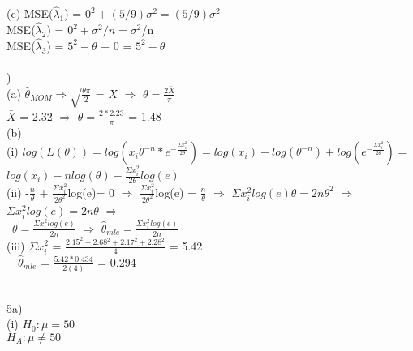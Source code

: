 \documentclass[12pt]{article}
\begin{document}
\indent (c) MSE($\hat{\lambda}_1$) = $0^2 + (5/9)\sigma^2 = (5/9)\sigma^2$\\
\indent \indent MSE($\hat{\lambda}_2$) = $0^2 + \sigma^2/n = \sigma^2$/n\\
\indent \indent MSE($\hat{\lambda}_3$) = $5^2 - \theta$ + 0 = $5^2 - \theta$\\


\noindent \hrulefill \\


)\\
\indent (a) $\hat{\theta}_{MOM}\Rightarrow ${\Large $\sqrt{\frac{\theta \pi}{2}}$} = $\bar{X}$ $\Rightarrow$ $\theta = ${\Large $\frac{2\bar{X}}{\pi}$}\\
\indent \indent $\bar{X}$ = 2.32 $\Rightarrow$ $\theta = ${\Large $\frac{2*2.23}{\pi}$} = 1.48\\

\indent (b)\\
\indent (i) $log(L(\theta)) = log(x_i\theta^{-n}*e^{-\frac{\Sigma x_i^2}{2\theta}}) = log(x_i)+log(\theta^ 	{-n})+log(e^{-\frac{\Sigma x_i^2}{2\theta}}) = $\\[.4em]
\indent \indent $log(x_i)-nlog(\theta)-${\Large$\frac{\Sigma x_i^2}{2\theta}$}$log(e)$\\[.4em]

\indent (ii) -{\Large$\frac{n}{\theta}$} + {\Large$\frac{\Sigma x_i^2}{2\theta^2}$}log(e)= 0 $\Rightarrow$ {\Large$\frac{\Sigma x_i^2}{2\theta^2}$}log(e) = {\Large$\frac{n}{\theta}$} $\Rightarrow$ $\Sigma x_i^2log(e)\theta = 2n\theta^2$ $\Rightarrow$ $\Sigma x_i^2log(e) = 2n\theta$ $\Rightarrow$ \\[.4em]
\indent \indent \ $ \theta = ${\Large$\frac{\Sigma x_i^2log(e)}{2n}$} $\Rightarrow$ $\hat{\theta}_{mle} = ${\Large$\frac{\Sigma x_i^2log(e)}{2n}$}\\

\indent (iii) $\Sigma x_i^2$ = {\Large$\frac{2.15^2 + 2.68^2 + 2.17^2 + 2.28^2}{4}$} = 5.42\\[.4em]
\indent \indent \ \ $\hat{\theta}_{mle}$ = {\Large$\frac{5.42*0.434}{2(4)}$} = 0.294\\


\noindent \hrulefill \\
\pagebreak


\noindent 5a)\\
\indent (i) $H_0 : \mu = 50$\\
\indent \indent $H_A : \mu \ne 50$\\
\end{document}
